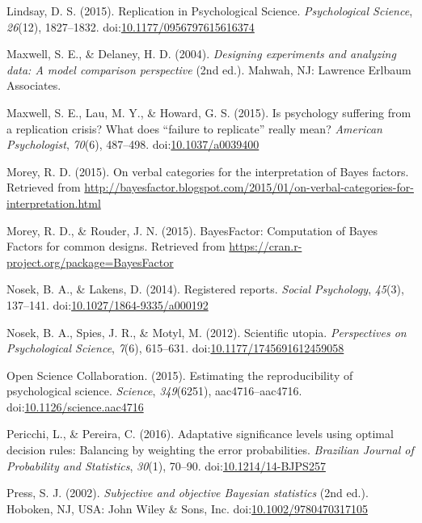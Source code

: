 \documentclass[english,mask,man]{apa6}
\theoremstyle{definition}
\theoremstyle{definition}
\theoremstyle{definition}
\theoremstyle{remark}
\begin{document}
\hypertarget{ref-Lindsay2015}{}
Lindsay, D. S. (2015). Replication in Psychological Science.
\emph{Psychological Science}, \emph{26}(12), 1827--1832.
doi:\href{https://doi.org/10.1177/0956797615616374}{10.1177/0956797615616374}

\hypertarget{ref-Maxwell2004}{}
Maxwell, S. E., \& Delaney, H. D. (2004). \emph{Designing experiments
and analyzing data: A model comparison perspective} (2nd ed.). Mahwah,
NJ: Lawrence Erlbaum Associates.

\hypertarget{ref-Maxwell2015}{}
Maxwell, S. E., Lau, M. Y., \& Howard, G. S. (2015). Is psychology
suffering from a replication crisis? What does ``failure to replicate''
really mean? \emph{American Psychologist}, \emph{70}(6), 487--498.
doi:\href{https://doi.org/10.1037/a0039400}{10.1037/a0039400}

\hypertarget{ref-Morey2015c}{}
Morey, R. D. (2015). On verbal categories for the interpretation of
Bayes factors. Retrieved from
\url{http://bayesfactor.blogspot.com/2015/01/on-verbal-categories-for-interpretation.html}

\hypertarget{ref-Morey2015b}{}
Morey, R. D., \& Rouder, J. N. (2015). BayesFactor: Computation of Bayes
Factors for common designs. Retrieved from
\url{https://cran.r-project.org/package=BayesFactor}

\hypertarget{ref-Nosek2014}{}
Nosek, B. A., \& Lakens, D. (2014). Registered reports. \emph{Social
Psychology}, \emph{45}(3), 137--141.
doi:\href{https://doi.org/10.1027/1864-9335/a000192}{10.1027/1864-9335/a000192}

\hypertarget{ref-Nosek2012}{}
Nosek, B. A., Spies, J. R., \& Motyl, M. (2012). Scientific utopia.
\emph{Perspectives on Psychological Science}, \emph{7}(6), 615--631.
doi:\href{https://doi.org/10.1177/1745691612459058}{10.1177/1745691612459058}

\hypertarget{ref-OpenScienceCollaboration2015}{}
Open Science Collaboration. (2015). Estimating the reproducibility of
psychological science. \emph{Science}, \emph{349}(6251),
aac4716--aac4716.
doi:\href{https://doi.org/10.1126/science.aac4716}{10.1126/science.aac4716}

\hypertarget{ref-Pericchi2016}{}
Pericchi, L., \& Pereira, C. (2016). Adaptative significance levels
using optimal decision rules: Balancing by weighting the error
probabilities. \emph{Brazilian Journal of Probability and Statistics},
\emph{30}(1), 70--90.
doi:\href{https://doi.org/10.1214/14-BJPS257}{10.1214/14-BJPS257}

\hypertarget{ref-Press2002}{}
Press, S. J. (2002). \emph{Subjective and objective Bayesian statistics}
(2nd ed.). Hoboken, NJ, USA: John Wiley \& Sons, Inc.
doi:\href{https://doi.org/10.1002/9780470317105}{10.1002/9780470317105}
\end{document}
